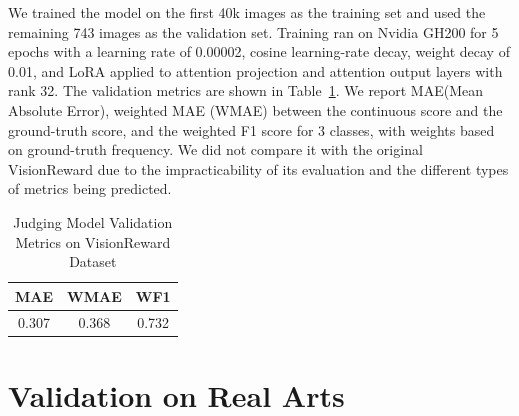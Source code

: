 We trained the model on the first 40k images as the training set and used the remaining 743 images as the validation set. Training ran on Nvidia GH200 for 5 epochs with a learning rate of 0.00002, cosine learning-rate decay, weight decay of 0.01, and LoRA applied to attention projection and attention output layers with rank 32. The validation metrics are shown in Table~\ref{tab:val}. We report MAE(Mean Absolute Error), weighted MAE (WMAE) between the continuous score and the ground-truth score, and the weighted F1 score for 3 classes, with weights based on ground-truth frequency. We did not compare it with the original VisionReward due to the impracticability of its evaluation and the different types of metrics being predicted. 
\begin{table}[h]
    \centering
    \small
    \begin{tabular}{ccc}
         \hline
         MAE & WMAE & WF1 \\
         \hline
         0.307 & 0.368 & 0.732 \\
         \hline
    \end{tabular}
    \caption{Judging Model Validation Metrics on VisionReward Dataset}
    \label{tab:val}
\end{table}


\section{Validation on Real Arts}

